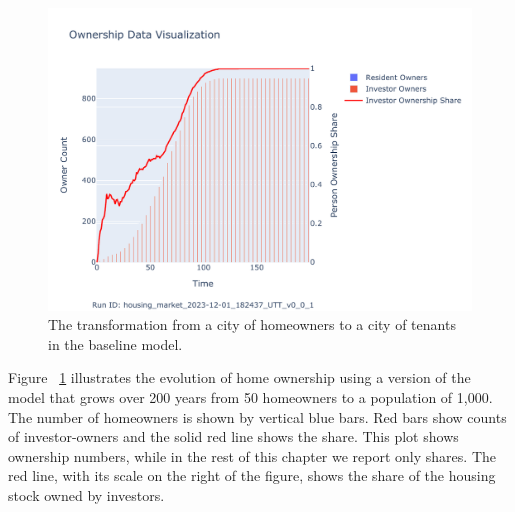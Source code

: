 \begin{figure}[h!tb]
\centering
\hspace{4cm} %
\includegraphics[scale=0.8, trim={0 1cm 0 1.8cm}, clip]{fig/Analysis/Ownership_Data_1.pdf}
\caption[The ownership result]{The transformation from a city of homeowners to a city of tenants in the baseline model.}
\label{fig:Baseline_ownership_trajectory}
\end{figure}


Figure ~\ref{fig:Baseline_ownership_trajectory} illustrates the evolution of home ownership using a version of the model that grows over 200 years from 50 homeowners to a population of 1,000. The number of homeowners is shown by vertical blue bars.  Red bars show counts of investor-owners and the solid red line shows the share. This plot shows ownership numbers, while in the rest of this chapter we report only shares. %
The red line, with its scale on the right of the figure, shows the share of the housing stock owned by investors. 

